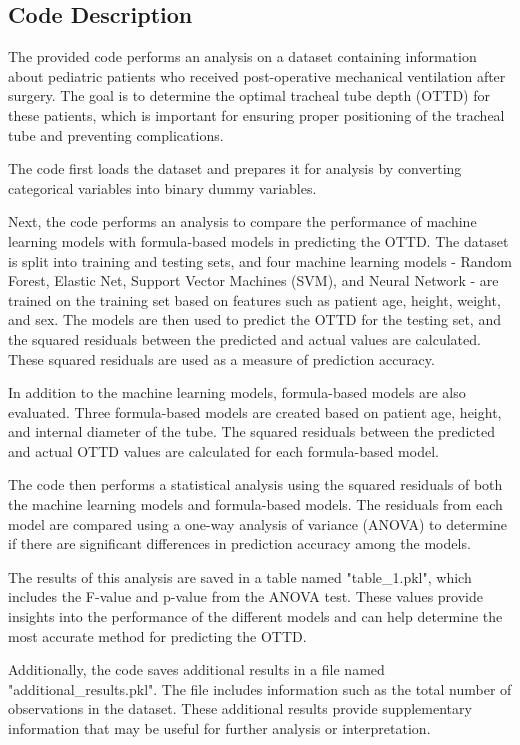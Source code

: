 \documentclass[11pt]{article}
\begin{document}
\subsection{Code Description}

The provided code performs an analysis on a dataset containing information about pediatric patients who received post-operative mechanical ventilation after surgery. The goal is to determine the optimal tracheal tube depth (OTTD) for these patients, which is important for ensuring proper positioning of the tracheal tube and preventing complications.

The code first loads the dataset and prepares it for analysis by converting categorical variables into binary dummy variables. 

Next, the code performs an analysis to compare the performance of machine learning models with formula-based models in predicting the OTTD. The dataset is split into training and testing sets, and four machine learning models - Random Forest, Elastic Net, Support Vector Machines (SVM), and Neural Network - are trained on the training set based on features such as patient age, height, weight, and sex. The models are then used to predict the OTTD for the testing set, and the squared residuals between the predicted and actual values are calculated. These squared residuals are used as a measure of prediction accuracy.

In addition to the machine learning models, formula-based models are also evaluated. Three formula-based models are created based on patient age, height, and internal diameter of the tube. The squared residuals between the predicted and actual OTTD values are calculated for each formula-based model.

The code then performs a statistical analysis using the squared residuals of both the machine learning models and formula-based models. The residuals from each model are compared using a one-way analysis of variance (ANOVA) to determine if there are significant differences in prediction accuracy among the models.

The results of this analysis are saved in a table named "table\_1.pkl", which includes the F-value and p-value from the ANOVA test. These values provide insights into the performance of the different models and can help determine the most accurate method for predicting the OTTD.

Additionally, the code saves additional results in a file named "additional\_results.pkl". The file includes information such as the total number of observations in the dataset. These additional results provide supplementary information that may be useful for further analysis or interpretation.
\end{document}
